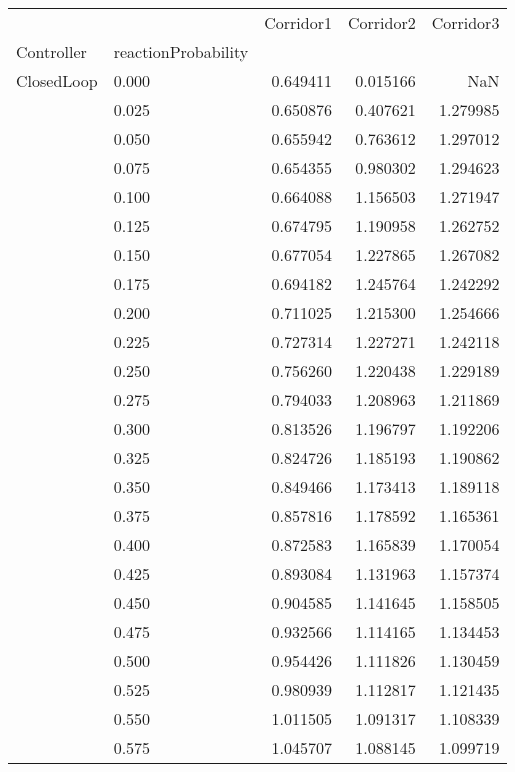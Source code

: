 \begin{tabular}{llrrr}
\toprule
         &       &  Corridor1 &  Corridor2 &  Corridor3 \\
Controller & reactionProbability &            &            &            \\
\midrule
ClosedLoop & 0.000 &   0.649411 &   0.015166 &        NaN \\
         & 0.025 &   0.650876 &   0.407621 &   1.279985 \\
         & 0.050 &   0.655942 &   0.763612 &   1.297012 \\
         & 0.075 &   0.654355 &   0.980302 &   1.294623 \\
         & 0.100 &   0.664088 &   1.156503 &   1.271947 \\
         & 0.125 &   0.674795 &   1.190958 &   1.262752 \\
         & 0.150 &   0.677054 &   1.227865 &   1.267082 \\
         & 0.175 &   0.694182 &   1.245764 &   1.242292 \\
         & 0.200 &   0.711025 &   1.215300 &   1.254666 \\
         & 0.225 &   0.727314 &   1.227271 &   1.242118 \\
         & 0.250 &   0.756260 &   1.220438 &   1.229189 \\
         & 0.275 &   0.794033 &   1.208963 &   1.211869 \\
         & 0.300 &   0.813526 &   1.196797 &   1.192206 \\
         & 0.325 &   0.824726 &   1.185193 &   1.190862 \\
         & 0.350 &   0.849466 &   1.173413 &   1.189118 \\
         & 0.375 &   0.857816 &   1.178592 &   1.165361 \\
         & 0.400 &   0.872583 &   1.165839 &   1.170054 \\
         & 0.425 &   0.893084 &   1.131963 &   1.157374 \\
         & 0.450 &   0.904585 &   1.141645 &   1.158505 \\
         & 0.475 &   0.932566 &   1.114165 &   1.134453 \\
         & 0.500 &   0.954426 &   1.111826 &   1.130459 \\
         & 0.525 &   0.980939 &   1.112817 &   1.121435 \\
         & 0.550 &   1.011505 &   1.091317 &   1.108339 \\
         & 0.575 &   1.045707 &   1.088145 &   1.099719 \\

\end{tabular}
